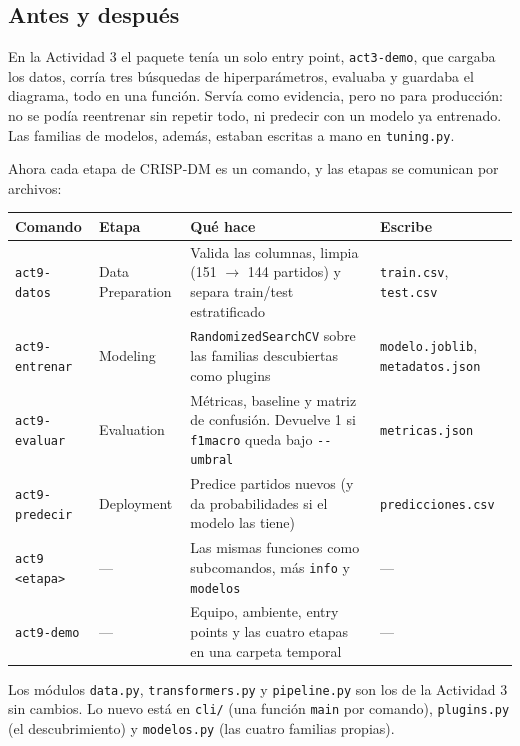 \documentclass[12pt,a4paper]{article}
\renewcommand{\_}{\guionbajo\allowbreak}
\begin{document}
\subsection{Antes y después}

En la Actividad 3 el paquete tenía un solo entry point, \texttt{act3-demo}, que cargaba los datos,
corría tres búsquedas de hiperparámetros, evaluaba y guardaba el diagrama, todo en una función.
Servía como evidencia, pero no para producción: no se podía reentrenar sin repetir todo, ni
predecir con un modelo ya entrenado. Las familias de modelos, además, estaban escritas a mano en
\texttt{tuning.py}.

Ahora cada etapa de CRISP-DM es un comando, y las etapas se comunican por archivos:

\begin{center}
\small
\renewcommand{\arraystretch}{1.35}
\begin{tabular}{|>{\raggedright\arraybackslash}p{2.6cm}|>{\raggedright\arraybackslash}p{2.2cm}|>{\raggedright\arraybackslash}p{5cm}|>{\raggedright\arraybackslash}p{3.8cm}|}
\hline
\textbf{Comando} & \textbf{Etapa} & \textbf{Qué hace} & \textbf{Escribe} \\
\hline
\texttt{act9-datos} & Data Preparation & Valida las columnas, limpia (151 $\rightarrow$ 144 partidos) y
separa train/test estratificado & \texttt{train.csv}, \texttt{test.csv} \\
\hline
\texttt{act9-entrenar} & Modeling & \texttt{RandomizedSearchCV} sobre las familias descubiertas como
plugins & \texttt{modelo.joblib}, \texttt{metadatos.json} \\
\hline
\texttt{act9-evaluar} & Evaluation & Métricas, baseline y matriz de confusión. Devuelve 1 si
\texttt{f1\_macro} queda bajo \texttt{-{}-umbral} & \texttt{metricas.json} \\
\hline
\texttt{act9-predecir} & Deployment & Predice partidos nuevos (y da probabilidades si el modelo las
tiene) & \texttt{predicciones.csv} \\
\hline
\texttt{act9 <etapa>} & --- & Las mismas funciones como subcomandos, más \texttt{info} y
\texttt{modelos} & --- \\
\hline
\texttt{act9-demo} & --- & Equipo, ambiente, entry points y las cuatro etapas en una carpeta
temporal & --- \\
\hline
\end{tabular}
\end{center}

Los módulos \texttt{data.py}, \texttt{transformers.py} y \texttt{pipeline.py} son los de la
Actividad 3 sin cambios. Lo nuevo está en \texttt{cli/} (una función \texttt{main} por comando),
\texttt{plugins.py} (el descubrimiento) y \texttt{modelos.py} (las cuatro familias propias).
\end{document}
